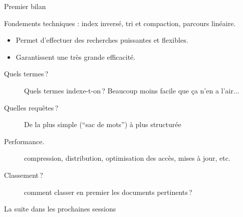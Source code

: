 \begin{frame}{Premier bilan}

Fondements techniques : index inversé, tri et compaction, parcours linéaire.

\begin{itemize}
 \item Permet d'effectuer des recherches \alert{puissantes}
     et \alert{flexibles}.
 \item \alert{Garantissent une très grande efficacité.}
\end{itemize}
\vfill

\begin{description}
 \item[\alert{Quels termes}\,?] Quels termes indexe-t-on\,? Beaucoup moins facile que ça n'en a l'air...
 \item[\alert{Quelles requêtes}\,?] De la plus simple (``sac de mots'') à plus 
                 structurée 
   \item[Performance.] compression, distribution, optimisation des accès,  mises à jour, etc.
  \item[\alert{Classement}\,?]  comment classer en premier les documents pertinents\,?
\end{description}

\vfill
\begin{blocgauche}
La suite dans les prochaines sessions
\end{blocgauche}

\end{frame}

